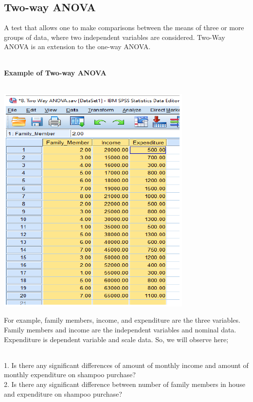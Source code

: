 \documentclass[
  letterpaper,
  DIV=11,
  numbers=noendperiod]{scrreprt}
\begin{document}
\subsection{Two-way ANOVA}\label{two-way-anova}

\hfill\break
A test that allows one to make comparisons between the means of three or
more groups of data, where two independent variables are considered.
Two-Way ANOVA is an extension to the one-way ANOVA.\\
\strut \\
\textbf{Example of Two-way ANOVA}\\
\strut \\

\includegraphics{images/two-way-anova.png}

For example, family members, income, and expenditure are the three
variables. Family members and income are the independent variables and
nominal data. Expenditure is dependent variable and scale data. So, we
will observe here;\\
\strut \\
1. Is there any significant differences of amount of monthly income and
amount of monthly expenditure on shampoo purchase?\\
2. Is there any significant difference between number of family members
in house and expenditure on shampoo purchase?\\
\end{document}
